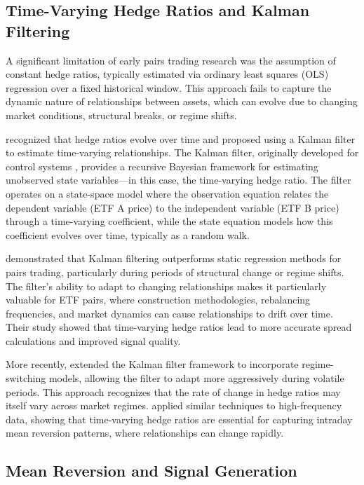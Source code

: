 \documentclass[12pt]{article}
\begin{document}
\subsection{Time-Varying Hedge Ratios and Kalman Filtering}

A significant limitation of early pairs trading research was the assumption of constant hedge ratios, typically estimated via ordinary least squares (OLS) regression over a fixed historical window. This approach fails to capture the dynamic nature of relationships between assets, which can evolve due to changing market conditions, structural breaks, or regime shifts.

\citet{elliott2005pairs} recognized that hedge ratios evolve over time and proposed using a Kalman filter to estimate time-varying relationships. The Kalman filter, originally developed for control systems \citep{kalman1960new}, provides a recursive Bayesian framework for estimating unobserved state variables—in this case, the time-varying hedge ratio. The filter operates on a state-space model where the observation equation relates the dependent variable (ETF A price) to the independent variable (ETF B price) through a time-varying coefficient, while the state equation models how this coefficient evolves over time, typically as a random walk.

\citet{triantafyllopoulos2007state} demonstrated that Kalman filtering outperforms static regression methods for pairs trading, particularly during periods of structural change or regime shifts. The filter's ability to adapt to changing relationships makes it particularly valuable for ETF pairs, where construction methodologies, rebalancing frequencies, and market dynamics can cause relationships to drift over time. Their study showed that time-varying hedge ratios lead to more accurate spread calculations and improved signal quality.

More recently, \citet{miao2017pairs} extended the Kalman filter framework to incorporate regime-switching models, allowing the filter to adapt more aggressively during volatile periods. This approach recognizes that the rate of change in hedge ratios may itself vary across market regimes. \citet{avellaneda2010statistical} applied similar techniques to high-frequency data, showing that time-varying hedge ratios are essential for capturing intraday mean reversion patterns, where relationships can change rapidly.

\subsection{Mean Reversion and Signal Generation}
\end{document}

